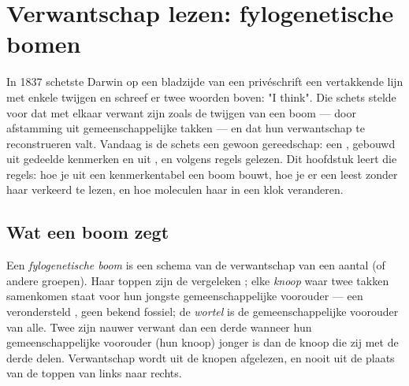 \chapter{Verwantschap lezen: fylogenetische bomen}\label{ch:g12:phylogenetic-trees}

In 1837 schetste Darwin op een bladzijde van een privéschrift een
vertakkende lijn met enkele twijgen en schreef er twee woorden boven: "I
think". Die schets stelde voor dat  met elkaar verwant zijn zoals
de twijgen van een boom --- door afstamming uit gemeenschappelijke takken
--- en dat hun verwantschap te reconstrueren valt. Vandaag is de schets
een gewoon gereedschap: een , gebouwd uit gedeelde
kenmerken en uit , en volgens regels gelezen. Dit hoofdstuk leert die
regels: hoe je uit een kenmerkentabel een boom bouwt, hoe je er een leest
zonder haar verkeerd te lezen, en hoe moleculen haar in een klok
veranderen.

\section{Wat een boom zegt}

\begin{definition}\label{def:g12:phylogenetic-trees:tree}
Een \emph{fylogenetische boom} is een schema
van de verwantschap van een aantal  (of andere groepen). Haar
toppen zijn de vergeleken ; elke \emph{knoop} waar twee takken
samenkomen staat voor hun jongste gemeenschappelijke voorouder --- een
verondersteld , geen bekend fossiel; de \emph{wortel} is de
gemeenschappelijke voorouder van alle. Twee  zijn nauwer verwant
dan een derde wanneer hun gemeenschappelijke voorouder (hun knoop) jonger
is dan de knoop die zij met de derde delen. Verwantschap wordt uit de
knopen afgelezen, en nooit uit de plaats van de toppen van links naar
rechts.
\end{definition}

